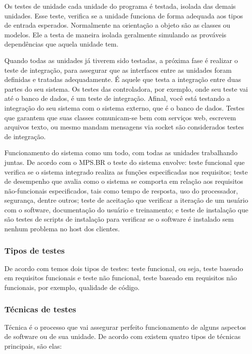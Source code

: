 Os testes de unidade cada unidade do programa é testada, isolada das demais unidades. Esse teste, verifica se a unidade funciona de forma adequada aos tipos de entrada esperados. Normalmente na orientação a objeto são as classes ou modelos.  Ele a testa de maneira isolada geralmente simulando as prováveis dependências que aquela unidade tem.

Quando todas as unidades já tiverem sido testadas, a próxima fase é realizar o teste de integração, para assegurar que as interfaces entre as unidades foram definidas e tratadas adequadamente. É aquele que testa a integração entre duas partes do seu sistema. Os testes das controladora, por exemplo, onde seu teste vai até o banco de dados, é um teste de integração. Afinal, você está testando a integração do seu sistema com o sistema externo, que é o banco de dados. Testes que garantem que suas classes comunicam-se bem com serviços web, escrevem arquivos texto, ou mesmo mandam mensagens via socket são considerados testes de integração.

Funcionamento do sistema como um todo, com todas as unidades trabalhando juntas. De acordo com o MPS.BR o teste do sistema envolve: teste funcional que verifica se o sistema integrado realiza as funções especificadas nos requisitos; teste de desempenho que avalia como o sistema se comporta em relação aos requisitos não-funcionais especificados, tais como tempo de resposta, uso do processador, segurança, dentre outros; teste de aceitação que verificar a iteração de um usuário com o software, documentação do usuário e treinamento; e teste de instalação que são testes de scripts de instalação para verificar se o software é instalado sem nenhum problema no host dos clientes.

\subsubsection{Tipos de testes}

De acordo com \cite{myers} temos dois tipos de testes: teste funcional, ou seja, teste baseado em requisitos funcionais e teste não funcional, teste baseado em requisitos não funcionais, por exemplo, qualidade de código.

\subsubsection{Técnicas de testes}

Técnica é o processo que vai assegurar perfeito funcionamento de alguns aspectos de software ou de sua unidade. De
acordo com \cite{myers} existem quatro tipos de técnicas principais, são elas:


